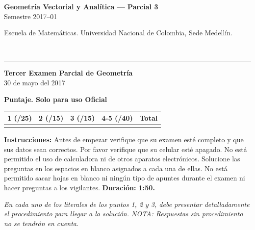 \documentclass[11pt]{article}
\newcommand{\nota}[1]{{\small\itshape\color{unalblue!70!black} #1}}
\begin{document}
\noindent
\begin{minipage}[t]{0.6\linewidth}
{\small\bfseries Geometría Vectorial y Analítica --- Parcial 3}\\
{\small Semestre 2017--01}
\end{minipage}%
\hfill
\begin{minipage}[t]{0.35\linewidth}
\raggedleft\small Escuela de Matemáticas. Universidad Nacional de Colombia, Sede Medellín.
\end{minipage}\\[2pt]
\rule{\linewidth}{0.6pt}

\begin{center}
\textbf{Tercer Examen Parcial de Geometría}\\
30 de mayo del 2017
\end{center}

\vspace{6pt}
\textbf{Puntaje. Solo para uso Oficial}

\begin{center}
\begin{tabular}{|c|c|c|c|c|}
\hline
1 (/25) & 2 (/15) & 3 (/15) & 4-5 (/40) & Total \\
\hline
 & & & & \\
\hline
\end{tabular}
\end{center}

\vspace{10pt}
\textbf{Instrucciones:} Antes de empezar verifique que su examen esté completo y que sus datos sean correctos. Por favor verifique que su celular esté apagado. No está permitido el uso de calculadora ni de otros aparatos electrónicos. Solucione las preguntas en los espacios en blanco asignados a cada una de ellas. No está permitido sacar hojas en blanco ni ningún tipo de apuntes durante el examen ni hacer preguntas a los vigilantes. \textbf{Duración: 1:50.}

\vspace{6pt}
\nota{En cada uno de los literales de los puntos 1, 2 y 3, debe presentar detalladamente el procedimiento para llegar a la solución. NOTA: Respuestas sin procedimiento no se tendrán en cuenta.}
\end{document}

